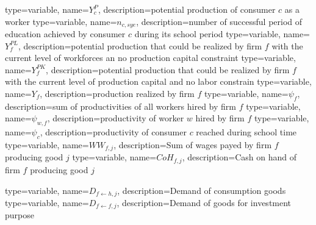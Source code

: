 {%
  type=variable,%
  name={$Y^{P}_{c}$},%
  description={potential production of consumer $c$ as a worker} 
}
{%
  type=variable,%
  name={$n_{c,sye}$},%
  description={number of successful period of education achieved by consumer $c$ during its school period} 
}
{%
  type=variable,%
  name={$Y^{PL}_{f}$},%
  description={potential production that could be realized by firm $f$ with the current level of workforces an no production capital constraint} 
}
{%
  type=variable,%
  name={$Y^{PK}_{f}$},%
  description={potential production that could be realized by firm $f$ with the current level of production capital and no labor constrain} 
}
{%
  type=variable,%
  name={$Y_{f}$},%
  description={production realized by firm $f$} 
}
{%
  type=variable,%
  name={$\psi_{f}$},%
  description={sum of productivities of all workers hired by firm $f$} 
}
{%
  type=variable,%
  name={$\psi_{w,f}$},%
  description={productivity of worker $w$ hired by firm $f$} 
}
{%
  type=variable,%
  name={$\psi_{c}$},%
  description={productivity of consumer $c$ reached during school time} 
}
{%
  type=variable,%
  name={$WW_{f,j}$},%
  description={Sum of wages payed by firm $f$ producing good $j$} 
}
{%
  type=variable,%
  name={$CoH_{f,j}$},%
  description={Cash on hand of firm $f$ producing good $j$} 
}

{%
  type=variable,%
  name={$D_{f\leftarrow h,j}$},%
  description={Demand of consumption goods} 
}
{%
  type=variable,%
  name={$D_{f\leftarrow f,j}$},%
  description={Demand of goods for investment purpose} 
}
